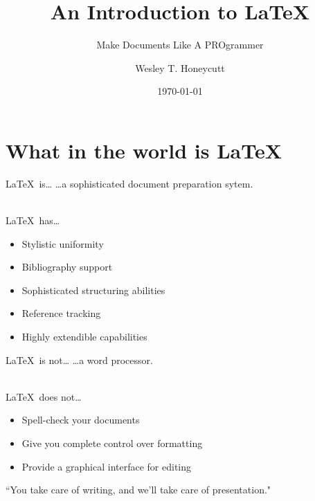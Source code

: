 \documentclass{beamer}
\title{An Introduction to \LaTeX}
\subtitle{Make Documents Like A PROgrammer}
\author{Wesley T. Honeycutt}
\institute{University of Oklahoma}
\date{\today}
\begin{document}
	\frame{\titlepage}
	
	
	\section{What in the world is \LaTeX}
	
	
		\begin{frame}{\LaTeX~is\ldots}
			\ldots a sophisticated document preparation sytem.
			\\~\\
			\begin{block}{\LaTeX~has\ldots}
				\begin{itemize}
					\item Stylistic uniformity
					\item Bibliography support
					\item Sophisticated structuring abilities
					\item Reference tracking
					\item Highly extendible capabilities
				\end{itemize}
			\end{block}
		\end{frame}
		
		\begin{frame}{\LaTeX~is not\ldots}
			\ldots a word processor.
			\\~\\
			\begin{block}{\LaTeX~does not\ldots}
			\begin{itemize}
				\item Spell-check your documents
				\item Give you complete control over formatting
				\item Provide a graphical interface for editing
			\end{itemize}
			\end{block}
			``You take care of writing, and we'll take care of presentation."
		\end{frame}
	
\end{document}
